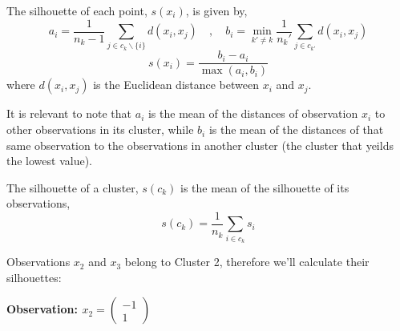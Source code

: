 \documentclass[12pt]{article}
\begin{document}
\begin{enumerate}[leftmargin=\labelsep]
\begin{enumerate}[resume]
                    The silhouette of each point, $s(x_i)$, is given by,
                    \begin{equation}\label{ex2b-ai-bi}
                        a_i = \frac{1}{n_k - 1} \sum_{j \in c_k \backslash \{i\}} d(x_i, x_j)
                        \quad,\quad
                        b_i = \min_{k' \ne k} \frac{1}{n_k'} \sum_{j \in c_{k'}} d(x_i, x_j)
                    \end{equation}
                    \begin{equation}\label{ex2b-s-xi}
                        s(x_i) = \frac{b_i - a_i}{\max(a_i,b_i)}
                    \end{equation}
                    where $d(x_i, x_j)$ is the Euclidean distance between $x_i$ and $x_j$.

                    It is relevant to note that $a_i$ is the mean of the distances of observation $x_i$ to other
                    observations in its cluster, while $b_i$ is the mean of the distances of
                    that same observation to the observations in another cluster (the cluster
                    that yeilds the lowest value).

                    The silhouette of a cluster, $s(c_k)$ is the mean of the silhouette of its observations,
                    \begin{equation}\label{ex2b-s-ck}
                        s(c_k) = \frac{1}{n_k} \sum_{i \in c_k} s_i
                    \end{equation}

                    Observations \textcolor{cblue}{$x_2$} and \textcolor{corange}{$x_3$}
                    belong to \colorbox{byellow}{Cluster 2}, therefore we'll calculate their
                    silhouettes:

                    \vspace*{0.5cm}

                    \begin{paracol}{2}
                        \begin{center}
                            \textbf{Observation: \textcolor{cblue}{$x_2 = \begin{pmatrix}
                                            -1 \\
                                            1
                                        \end{pmatrix}$}}
                        \end{center}


\end{paracol}
\end{enumerate}
\end{enumerate}
\end{document}

